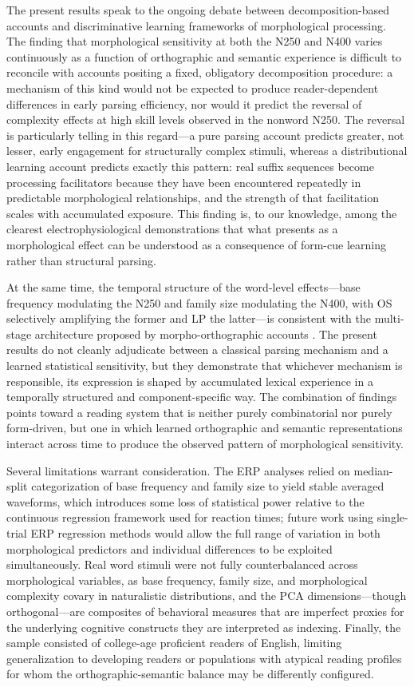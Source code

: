 	The present results speak to the ongoing debate between decomposition-based accounts and discriminative learning frameworks of morphological processing. The finding that morphological sensitivity at both the N250 and N400 varies continuously as a function of orthographic and semantic experience is difficult to reconcile with accounts positing a fixed, obligatory decomposition procedure: a mechanism of this kind would not be expected to produce reader-dependent differences in early parsing efficiency, nor would it predict the reversal of complexity effects at high skill levels observed in the nonword N250. The reversal is particularly telling in this regard—a pure parsing account predicts greater, not lesser, early engagement for structurally complex stimuli, whereas a distributional learning account predicts exactly this pattern: real suffix sequences become processing facilitators because they have been encountered repeatedly in predictable morphological relationships, and the strength of that facilitation scales with accumulated exposure. This finding is, to our knowledge, among the clearest electrophysiological demonstrations that what presents as a morphological effect can be understood as a consequence of form-cue learning rather than structural parsing.
	
	At the same time, the temporal structure of the word-level effects—base frequency modulating the N250 and family size modulating the N400, with OS selectively amplifying the former and LP the latter—is consistent with the multi-stage architecture proposed by morpho-orthographic accounts \citep{CITATION}. The present results do not cleanly adjudicate between a classical parsing mechanism and a learned statistical sensitivity, but they demonstrate that whichever mechanism is responsible, its expression is shaped by accumulated lexical experience in a temporally structured and component-specific way. The combination of findings points toward a reading system that is neither purely combinatorial nor purely form-driven, but one in which learned orthographic and semantic representations interact across time to produce the observed pattern of morphological sensitivity.
	
	Several limitations warrant consideration. The ERP analyses relied on median-split categorization of base frequency and family size to yield stable averaged waveforms, which introduces some loss of statistical power relative to the continuous regression framework used for reaction times; future work using single-trial ERP regression methods \citep{CITATION} would allow the full range of variation in both morphological predictors and individual differences to be exploited simultaneously. Real word stimuli were not fully counterbalanced across morphological variables, as base frequency, family size, and morphological complexity covary in naturalistic distributions, and the PCA dimensions—though orthogonal—are composites of behavioral measures that are imperfect proxies for the underlying cognitive constructs they are interpreted as indexing. Finally, the sample consisted of college-age proficient readers of English, limiting generalization to developing readers or populations with atypical reading profiles for whom the orthographic-semantic balance may be differently configured.
	
